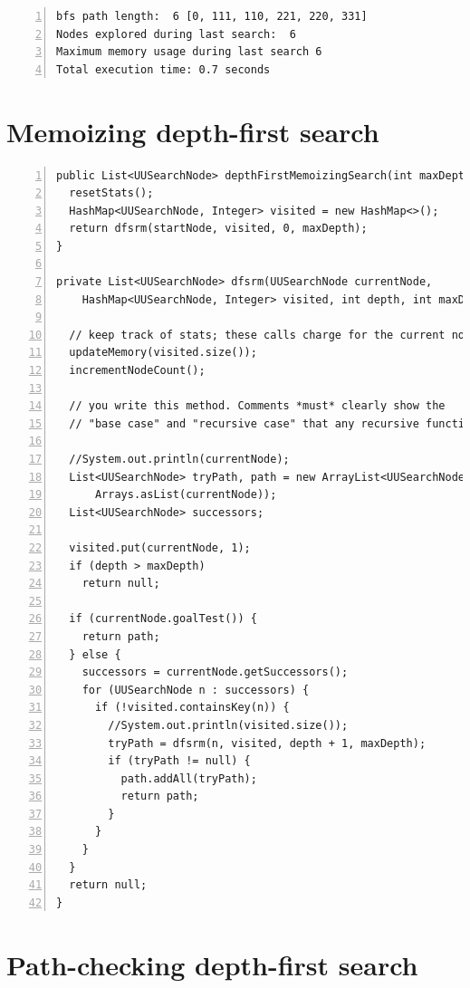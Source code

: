 \documentclass{article}
\begin{document}
\begin{lstlisting}[numbers=left]
bfs path length:  6 [0, 111, 110, 221, 220, 331]
Nodes explored during last search:  6
Maximum memory usage during last search 6
Total execution time: 0.7 seconds
\end{lstlisting}




\section{Memoizing depth-first search}

\begin{lstlisting}[numbers=left]
public List<UUSearchNode> depthFirstMemoizingSearch(int maxDepth) {
  resetStats();
  HashMap<UUSearchNode, Integer> visited = new HashMap<>();
  return dfsrm(startNode, visited, 0, maxDepth);
}

private List<UUSearchNode> dfsrm(UUSearchNode currentNode,
    HashMap<UUSearchNode, Integer> visited, int depth, int maxDepth) {

  // keep track of stats; these calls charge for the current node
  updateMemory(visited.size());
  incrementNodeCount();

  // you write this method. Comments *must* clearly show the
  // "base case" and "recursive case" that any recursive function has.

  //System.out.println(currentNode);
  List<UUSearchNode> tryPath, path = new ArrayList<UUSearchNode>(
      Arrays.asList(currentNode));
  List<UUSearchNode> successors;

  visited.put(currentNode, 1);
  if (depth > maxDepth)
    return null;      
  
  if (currentNode.goalTest()) {
    return path;
  } else {
    successors = currentNode.getSuccessors();
    for (UUSearchNode n : successors) {
      if (!visited.containsKey(n)) {
        //System.out.println(visited.size());
        tryPath = dfsrm(n, visited, depth + 1, maxDepth);
        if (tryPath != null) {
          path.addAll(tryPath);
          return path;
        }
      }
    }
  }
  return null;
}
\end{lstlisting}

\section{Path-checking depth-first search}
\end{document}

